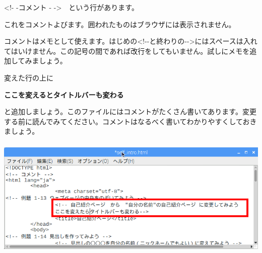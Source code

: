 \documentclass[a4paper,12pt]{jarticle}
\begin{document}
\bigskip

{\textless}!- -コメント -
-{\textgreater}　という行があります。

これをコメントよびます。囲われたものはブラウザには表示されません。

コメントはメモとして使えます。はじめの{\textless}!-{}-と終わりの{}-{}-{\textgreater}にはスペースは入れてはいけません。この記号の間であれば改行をしてもいません。試しにメモを追加してみましょう。

変えた行の上に

\textbf{ここを変えるとタイトルバーも変わる
}

と追加しましょう。このファイルにはコメントがたくさん書いてあります。変更する前に読んでみてください。コメントはなるべく書いてわかりやすくしておきましょう。


\centering
\includegraphics[width=14.42cm,height=5.768cm]{textbook-img150.png}
\end{document}
